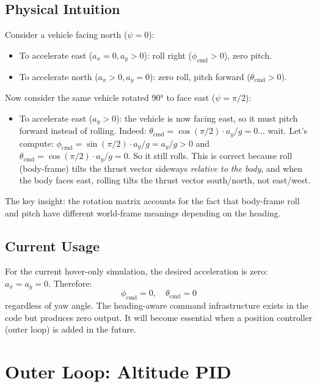 \documentclass[12pt, a4paper]{article}
\begin{document}
\subsection{Physical Intuition}

Consider a vehicle facing north ($\psi = 0$):
\begin{itemize}
    \item To accelerate east ($a_x = 0, a_y > 0$): roll right ($\phi_{\text{cmd}} > 0$), zero pitch.
    \item To accelerate north ($a_x > 0, a_y = 0$): zero roll, pitch forward ($\theta_{\text{cmd}} > 0$).
\end{itemize}

Now consider the same vehicle rotated 90° to face east ($\psi = \pi/2$):
\begin{itemize}
    \item To accelerate east ($a_y > 0$): the vehicle is now facing east, so it must pitch forward instead of rolling.  Indeed: $\theta_{\text{cmd}} = \cos(\pi/2) \cdot a_y / g = 0$... wait.  Let's compute: $\phi_{\text{cmd}} = \sin(\pi/2) \cdot a_y / g = a_y / g > 0$ and $\theta_{\text{cmd}} = \cos(\pi/2) \cdot a_y / g = 0$.  So it still rolls.  This is correct because roll (body-frame) tilts the thrust vector sideways \emph{relative to the body}, and when the body faces east, rolling tilts the thrust vector south/north, not east/west.
\end{itemize}

The key insight: the rotation matrix accounts for the fact that body-frame roll and pitch have different world-frame meanings depending on the heading.

\subsection{Current Usage}

For the current hover-only simulation, the desired acceleration is zero: $a_x = a_y = 0$.  Therefore:
\begin{equation}
    \phi_{\text{cmd}} = 0, \quad \theta_{\text{cmd}} = 0
\end{equation}
regardless of yaw angle.  The heading-aware command infrastructure exists in the code but produces zero output.  It will become essential when a position controller (outer loop) is added in the future.

\section{Outer Loop: Altitude PID}
\label{sec:pid}
\end{document}

